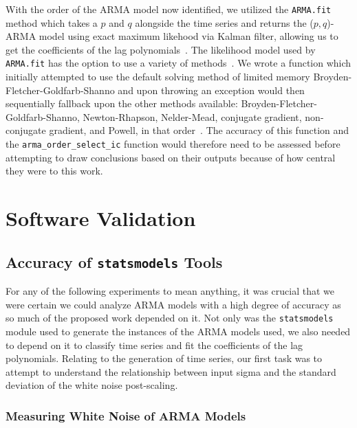 \documentclass[oneside,12pt,openany]{book}
\begin{document}
    With the order of the ARMA model now identified, we utilized the \texttt{ARMA.fit} method which takes a $p$ and $q$ alongside the time series and returns the ($p,q$)-ARMA model using exact maximum likehood via Kalman filter, allowing us to get the coefficients of the lag polynomials~\cite{statsmodels}. The likelihood model used by \texttt{ARMA.fit} has the option to use a variety of methods~\cite{statsmodels}. We wrote a function which initially attempted to use the default solving method of limited memory Broyden-Fletcher-Goldfarb-Shanno and upon throwing an exception would then sequentially fallback upon the other methods available: Broyden-Fletcher-Goldfarb-Shanno, Newton-Rhapson, Nelder-Mead, conjugate gradient, non-conjugate gradient, and Powell, in that order~\cite{statsmodels}. The accuracy of this function and the \texttt{arma\_order\_select\_ic} function would therefore need to be assessed before attempting to draw conclusions based on their outputs because of how central they were to this work.
    
    
	
    
    
    
    
    \chapter{Software Validation}
    
     \section{Accuracy of \texttt{statsmodels} Tools}\label{sec:res:stats}
    
    For any of the following experiments to mean anything, it was crucial that we were certain we could analyze ARMA models with a high degree of accuracy as so much of the proposed work depended on it. Not only was the \texttt{statsmodels} module used to generate the instances of the ARMA models used, we also needed to depend on it to classify time series and fit the coefficients of the lag polynomials. Relating to the generation of time series, our first task was to attempt to understand the relationship between input sigma and the standard deviation of the white noise post-scaling.
    
    \subsection{Measuring White Noise of ARMA Models}
    
\end{document}
